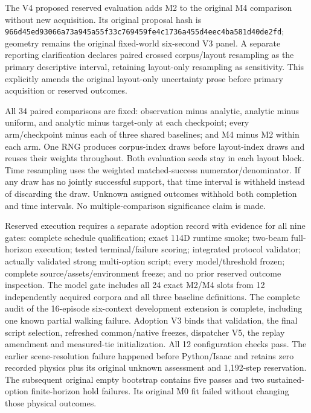 The V4 proposed reserved evaluation adds M2 to the original M4 comparison without
new acquisition. Its original proposal hash is
\texttt{966d45ed93066a73a945a55f33c769459fe4c1736a455d4eec4ba581d40de2fd};
geometry remains the original fixed-world six-second V3 panel. A separate
reporting clarification declares paired crossed corpus/layout resampling as the
primary descriptive interval, retaining layout-only resampling as sensitivity.
This explicitly amends the original layout-only uncertainty prose before
primary acquisition or reserved outcomes.

All 34 paired comparisons are fixed: observation minus analytic, analytic minus
uniform, and analytic minus target-only at each checkpoint; every arm/checkpoint
minus each of three shared baselines; and M4 minus M2 within each arm. One RNG
produces corpus-index draws before layout-index draws and reuses their weights
throughout. Both evaluation seeds stay in each layout block. Time resampling uses
the weighted matched-success numerator/denominator. If any draw has no jointly
successful support, that time interval is withheld instead of discarding the
draw. Unknown assigned outcomes withhold both completion and time intervals.
No multiple-comparison significance claim is made.

Reserved execution requires a separate adoption record with evidence for all
nine gates: complete schedule qualification; exact 114D runtime smoke; two-beam
full-horizon execution; tested terminal/failure scoring; integrated protocol
validator; actually validated strong multi-option script; every model/threshold
frozen; complete source/assets/environment freeze; and no prior reserved outcome
inspection. The model gate includes all 24 exact M2/M4 slots from 12 independently
acquired corpora and all three baseline definitions. The complete audit of the
16-episode six-context development extension is complete, including one known
partial walking failure. Adoption V3 binds that validation, the final script
selection, refreshed common/native freezes, dispatcher V5, the replay amendment
and measured-tie initialization. All 12 configuration checks pass. The earlier
scene-resolution failure happened before Python/Isaac and retains zero recorded
physics plus its original unknown assessment and 1,192-step reservation. The
subsequent original empty bootstrap contains five passes and two sustained-option
finite-horizon hold failures. Its original M0 fit failed without changing those
physical outcomes.

